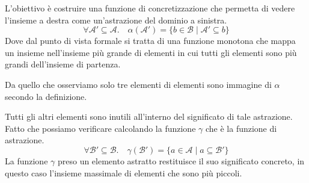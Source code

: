 L'obiettivo è costruire una funzione di concretizzazione che permetta di 
vedere l'insieme a destra come un'astrazione del dominio a sinistra.
\[
  \forall \mathcal{A}' \subseteq \mathcal{A} .
  \quad \alpha(\mathcal{A}') = \{b \in \mathcal{B} \mid \mathcal{A}' \subseteq b\}  
\]
Dove dal punto di vista formale si tratta di una funzione monotona che 
mappa un insieme nell'insieme più grande di 
elementi in cui tutti gli elementi sono più grandi dell'insieme di partenza.

Da quello che osserviamo solo tre elementi di elementi sono immagine di 
$\alpha$ secondo la definizione.

Tutti gli altri elementi sono inutili all'interno del significato di 
tale astrazione. Fatto che possiamo verificare calcolando la funzione 
$\gamma$ che è la funzione di astrazione.
\[
  \forall \mathcal{B}' \subseteq \mathcal{B} . 
    \quad \gamma(\mathcal{B}') = \{ a \in \mathcal{A} \mid a \subseteq \mathcal{B}' \}
\]
La funzione $\gamma$ preso un elemento astratto restituisce il suo significato 
concreto, in questo caso l'insieme massimale di elementi che sono più piccoli.
